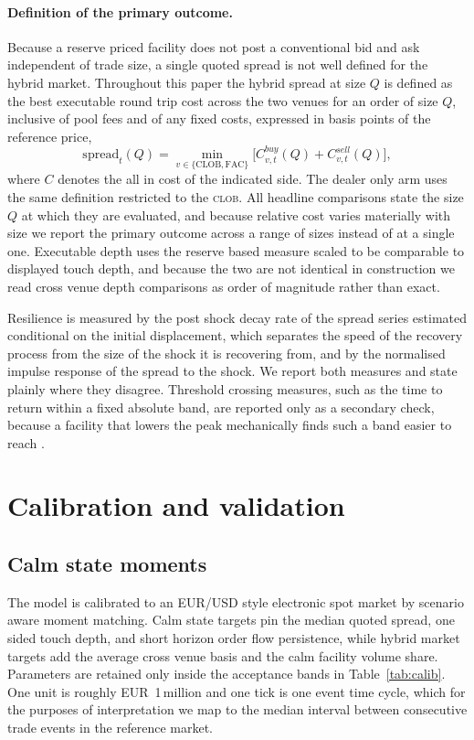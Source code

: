\documentclass[a4paper,fleqn]{cas-sc}
\newcommand{\acro}[1]{\textsc{\MakeLowercase{#1}}\xspace}
\newcommand{\CLOB}{\acro{CLOB}}
\begin{document}
\paragraph{Definition of the primary outcome.} Because a reserve priced facility does not post a conventional bid and ask independent of trade size, a single quoted spread is not well defined for the hybrid market. Throughout this paper the hybrid spread at size \(Q\) is defined as the best executable round trip cost across the two venues for an order of size \(Q\), inclusive of pool fees and of any fixed costs, expressed in basis points of the reference price,
\begin{equation}
\mathrm{spread}_t(Q)=\min_{v\in\{\mathrm{CLOB},\mathrm{FAC}\}} \Big[C^{buy}_{v,t}(Q)+C^{sell}_{v,t}(Q)\Big],
\end{equation}
where \(C\) denotes the all in cost of the indicated side. The dealer only arm uses the same definition restricted to the \CLOB{}. All headline comparisons state the size \(Q\) at which they are evaluated, and because relative cost varies materially with size we report the primary outcome across a range of sizes instead of at a single one. Executable depth uses the reserve based measure scaled to be comparable to displayed touch depth, and because the two are not identical in construction we read cross venue depth comparisons as order of magnitude rather than exact.

Resilience is measured by the post shock decay rate of the spread series estimated conditional on the initial displacement, which separates the speed of the recovery process from the size of the shock it is recovering from, and by the normalised impulse response of the spread to the shock. We report both measures and state plainly where they disagree. Threshold crossing measures, such as the time to return within a fixed absolute band, are reported only as a secondary check, because a facility that lowers the peak mechanically finds such a band easier to reach \citep{foucault2005,lohall2015}.

\section{Calibration and validation}
\label{sec:calib}

\subsection{Calm state moments}

The model is calibrated to an EUR/USD style electronic spot market by scenario aware moment matching. Calm state targets pin the median quoted spread, one sided touch depth, and short horizon order flow persistence, while hybrid market targets add the average cross venue basis and the calm facility volume share. Parameters are retained only inside the acceptance bands in Table~\ref{tab:calib}. One unit is roughly EUR~1\,million and one tick is one event time cycle, which for the purposes of interpretation we map to the median interval between consecutive trade events in the reference market.
\end{document}
